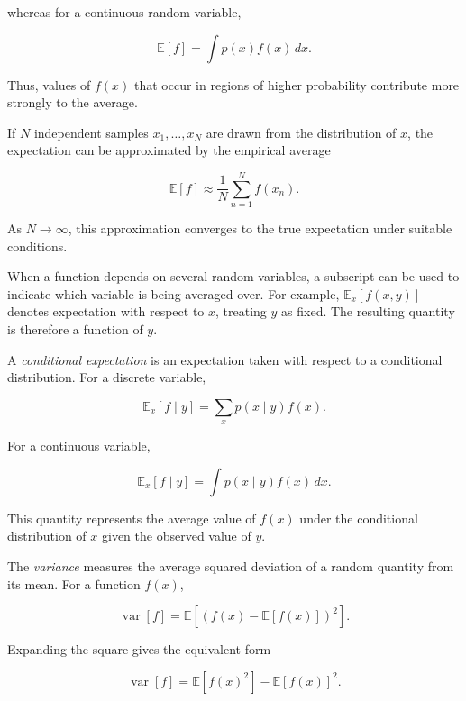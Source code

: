 \documentclass[10pt,twocolumn]{memoir}
\begin{document}
whereas for a continuous random variable,

\begin{equation}
    \mathbb{E}[f] = \int p(x)f(x)\,dx.
\end{equation}

Thus, values of $f(x)$ that occur in regions of higher probability contribute more strongly to the average.

If $N$ independent samples $x_1,\ldots,x_N$ are drawn from the distribution of $x$, the expectation can be approximated by the empirical average

\begin{equation}
    \mathbb{E}[f] \approx \frac{1}{N}\sum_{n=1}^{N}f(x_n).
\end{equation}

As $N\to\infty$, this approximation converges to the true expectation under suitable conditions.

When a function depends on several random variables, a subscript can be used to indicate which variable is being averaged over. For example, $\mathbb{E}_x[f(x,y)]$ denotes expectation with respect to $x$, treating $y$ as fixed. The resulting quantity is therefore a function of $y$.

A \textit{conditional expectation} is an expectation taken with respect to a conditional distribution. For a discrete variable,

\begin{equation}
    \mathbb{E}_x[f \mid y] = \sum_x p(x \mid y)f(x).
\end{equation}

For a continuous variable,

\begin{equation}
    \mathbb{E}_x[f \mid y] = \int p(x \mid y)f(x)\,dx.
\end{equation}

This quantity represents the average value of $f(x)$ under the conditional distribution of $x$ given the observed value of $y$.

The \textit{variance} measures the average squared deviation of a random quantity from its mean. For a function $f(x)$,

\begin{equation}
    \operatorname{var}[f] = \mathbb{E}\left[\left(f(x)-\mathbb{E}[f(x)]\right)^2\right].
\end{equation}

Expanding the square gives the equivalent form

\begin{equation}
    \operatorname{var}[f] = \mathbb{E}[f(x)^2] - \mathbb{E}[f(x)]^2.
\end{equation}
\end{document}
